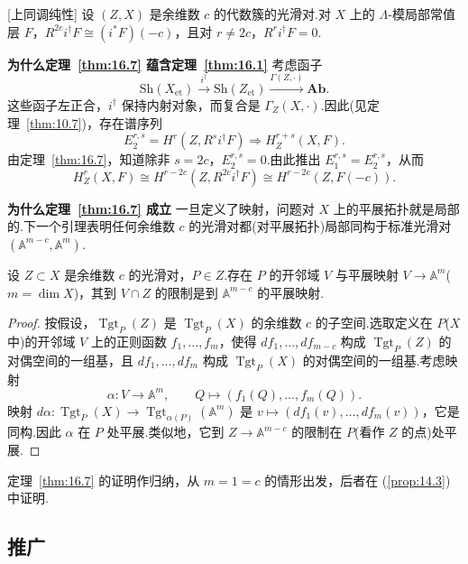 \begin{theorem}\label{thm:16.7}[上同调纯性]
设 $(Z, X)$ 是余维数 $c$ 的代数簇的光滑对.对 $X$ 上的 $\Lambda$-模局部常值层 $F$，$R^{2c}i^{\dagger}F \cong (i^{*}F)(-c)$，且对 $r \neq 2c$，$R^{r}i^{\dagger}F = 0$.
\end{theorem}

\textbf{为什么定理~\ref{thm:16.7} 蕴含定理~\ref{thm:16.1}} 考虑函子
\[
\mathrm{Sh}(X_{\mathrm{et}}) \xrightarrow{i^{\dagger}} \mathrm{Sh}(Z_{\mathrm{et}}) \xrightarrow{\Gamma(Z, \cdot)} \mathbf{Ab}.
\]
这些函子左正合，$i^{\dagger}$ 保持内射对象，而复合是 $\Gamma_Z(X, \cdot)$.因此(见定理~\ref{thm:10.7})，存在谱序列
\[
E^{r, s}_2 = H^{r}(Z, R^{s}i^{\dagger}F) \Rightarrow H^{r+s}_{Z}(X, F).
\]
由定理~\ref{thm:16.7}，知道除非 $s = 2c$，$E^{r, s}_2 = 0$.由此推出 $E^{r, s}_1 = E^{r, s}_2$，从而
\[
H^{r}_{Z}(X, F) \cong H^{r-2c}(Z, R^{2c}i^{\dagger}F) \cong H^{r-2c}(Z, F(-c)).
\]

\textbf{为什么定理~\ref{thm:16.7} 成立} 一旦定义了映射，问题对 $X$ 上的平展拓扑就是局部的.下一个引理表明任何余维数 $c$ 的光滑对都(对平展拓扑)局部同构于标准光滑对 $(\mathbb{A}^{m-c}, \mathbb{A}^{m})$.

\begin{lemma}\label{lem:16.8}
设 $Z \subset X$ 是余维数 $c$ 的光滑对，$P \in Z$.存在 $P$ 的开邻域 $V$ 与平展映射 $V \to \mathbb{A}^{m}$($m = \dim X$)，其到 $V \cap Z$ 的限制是到 $\mathbb{A}^{m-c}$ 的平展映射.
\end{lemma}

\begin{proof}
按假设，$\operatorname{Tgt}_{P}(Z)$ 是 $\operatorname{Tgt}_{P}(X)$ 的余维数 $c$ 的子空间.选取定义在 $P$($X$ 中)的开邻域 $V$ 上的正则函数 $f_1, \ldots, f_m$，使得 $df_1, \ldots, df_{m-c}$ 构成 $\operatorname{Tgt}_{P}(Z)$ 的对偶空间的一组基，且 $df_1, \ldots, df_m$ 构成 $\operatorname{Tgt}_{P}(X)$ 的对偶空间的一组基.考虑映射
\[
\alpha \colon V \to \mathbb{A}^{m}, \qquad Q \mapsto (f_1(Q), \ldots, f_m(Q)).
\]
映射 $d\alpha \colon \operatorname{Tgt}_{P}(X) \to \operatorname{Tgt}_{\alpha(P)}(\mathbb{A}^{m})$ 是 $v \mapsto (df_1(v), \ldots, df_m(v))$，它是同构.因此 $\alpha$ 在 $P$ 处平展.类似地，它到 $Z \to \mathbb{A}^{m-c}$ 的限制在 $P$(看作 $Z$ 的点)处平展.
\end{proof}

定理~\ref{thm:16.7} 的证明作归纳，从 $m = 1 = c$ 的情形出发，后者在 (\ref{prop:14.3}) 中证明.

\subsection*{推广}

